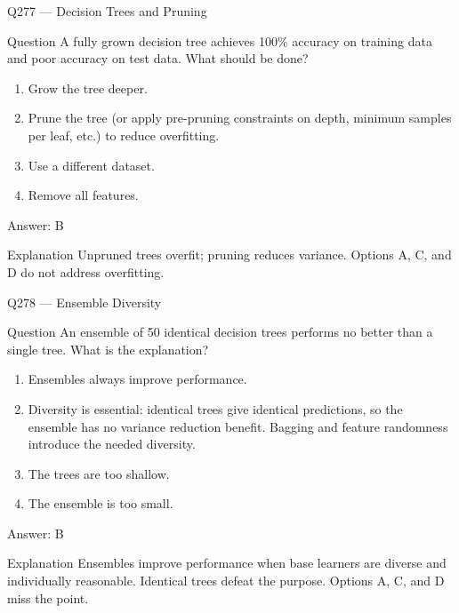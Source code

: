 \documentclass[aspectratio=169,8pt]{beamer}
\begin{document}
\begin{frame}{Q277 --- Decision Trees and Pruning}
\begin{block}{Question}
A fully grown decision tree achieves 100\% accuracy on training data and poor accuracy on test data. What should be done?
\begin{enumerate}
\item Grow the tree deeper.
\item Prune the tree (or apply pre-pruning constraints on depth, minimum samples per leaf, etc.) to reduce overfitting.
\item Use a different dataset.
\item Remove all features.
\end{enumerate} \end{block}
\begin{exampleblock}{Answer: B}\end{exampleblock}
\begin{block}{Explanation}
Unpruned trees overfit; pruning reduces variance. Options A, C, and D do not address overfitting.
\end{block}
\end{frame}

\begin{frame}{Q278 --- Ensemble Diversity}
\begin{block}{Question}
An ensemble of 50 identical decision trees performs no better than a single tree. What is the explanation?
\end{block}
\begin{enumerate}
\item Ensembles always improve performance.
\item Diversity is essential: identical trees give identical predictions, so the ensemble has no variance reduction benefit. Bagging and feature randomness introduce the needed diversity.
\item The trees are too shallow.
\item The ensemble is too small.
\end{enumerate}
\begin{exampleblock}{Answer: B}\end{exampleblock}
\begin{block}{Explanation}
Ensembles improve performance when base learners are diverse and individually reasonable. Identical trees defeat the purpose. Options A, C, and D miss the point.
\end{block}
\end{frame}
\end{document}
